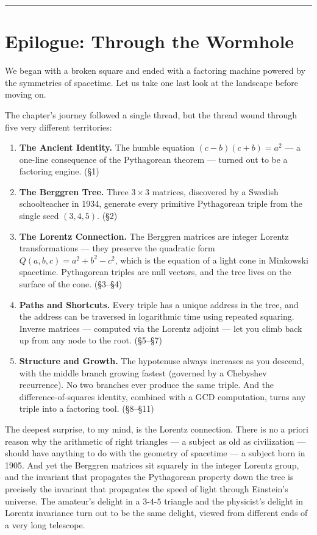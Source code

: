 \bigskip\noindent\rule{\linewidth}{0.4pt}\bigskip

\section{Epilogue: Through the Wormhole}
We began with a broken square and ended with a factoring machine powered by the symmetries of spacetime. Let us take one last look at the landscape before moving on.

The chapter's journey followed a single thread, but the thread wound through five very different territories:

\begin{enumerate}
\def\labelenumi{\arabic{enumi}.}
\item
  \textbf{The Ancient Identity.} The humble equation \((c - b)(c + b) = a^2\) --- a one-line consequence of the Pythagorean theorem --- turned out to be a factoring engine. (§1)
\item
  \textbf{The Berggren Tree.} Three \(3 \times 3\) matrices, discovered by a Swedish schoolteacher in 1934, generate every primitive Pythagorean triple from the single seed \((3, 4, 5)\). (§2)
\item
  \textbf{The Lorentz Connection.} The Berggren matrices are integer Lorentz transformations --- they preserve the quadratic form \(Q(a, b, c) = a^2 + b^2 - c^2\), which is the equation of a light cone in Minkowski spacetime. Pythagorean triples are null vectors, and the tree lives on the surface of the cone. (§3--§4)
\item
  \textbf{Paths and Shortcuts.} Every triple has a unique address in the tree, and the address can be traversed in logarithmic time using repeated squaring. Inverse matrices --- computed via the Lorentz adjoint --- let you climb back up from any node to the root. (§5--§7)
\item
  \textbf{Structure and Growth.} The hypotenuse always increases as you descend, with the middle branch growing fastest (governed by a Chebyshev recurrence). No two branches ever produce the same triple. And the difference-of-squares identity, combined with a GCD computation, turns any triple into a factoring tool. (§8--§11)
\end{enumerate}

The deepest surprise, to my mind, is the Lorentz connection. There is no a priori reason why the arithmetic of right triangles --- a subject as old as civilization --- should have anything to do with the geometry of spacetime --- a subject born in 1905. And yet the Berggren matrices sit squarely in the integer Lorentz group, and the invariant that propagates the Pythagorean property down the tree is precisely the invariant that propagates the speed of light through Einstein's universe. The amateur's delight in a \(3\)-\(4\)-\(5\) triangle and the physicist's delight in Lorentz invariance turn out to be the same delight, viewed from different ends of a very long telescope.

